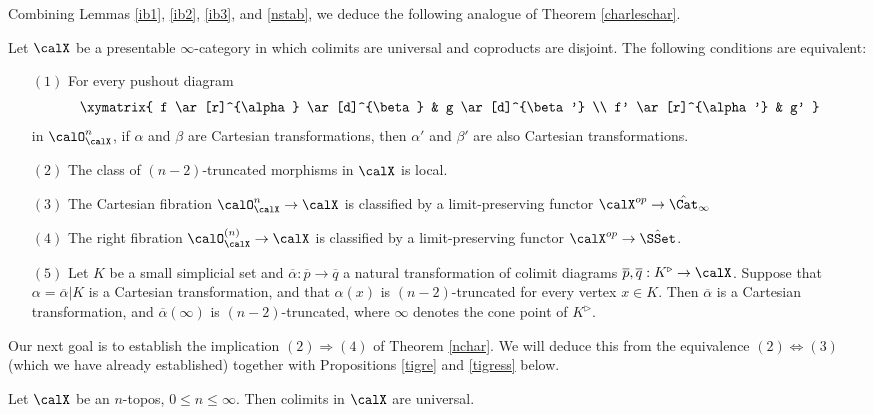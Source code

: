 Combining Lemmas \ref{ib1}, \ref{ib2}, \ref{ib3}, and \ref{nstab}, we deduce the following analogue of Theorem \ref{charleschar}.

\begin{theorem}\label{countercon}
Let $\calX$ be a presentable $\infty$-category in which colimits are universal and coproducts are disjoint. The following conditions are equivalent:
\begin{itemize}
\item[$(1)$] For every 
pushout diagram
$$ \xymatrix{ f \ar[r]^{\alpha} \ar[d]^{\beta} & g \ar[d]^{\beta'} \\
f' \ar[r]^{\alpha'} & g' }$$
in $\calO^{n}_{\calX}$, if $\alpha$ and $\beta$ are Cartesian transformations, then
$\alpha'$ and $\beta'$ are also Cartesian transformations.

\item[$(2)$] The class of $(n-2)$-truncated morphisms
in $\calX$ is local.

\item[$(3)$] The Cartesian fibration $\calO^{n}_{\calX} \rightarrow \calX$ is classified
by a limit-preserving functor $\calX^{op} \rightarrow \hat{\Cat}_{\infty}$

\item[$(4)$] The right fibration $\calO^{(n)}_{\calX} \rightarrow \calX$ is classified by a limit-preserving functor $\calX^{op} \rightarrow \hat{\SSet}$.

\item[$(5)$] Let $K$ be a small simplicial set and 
$\overline{\alpha}: \overline{p} \rightarrow \overline{q}$ a natural transformation of colimit diagrams
$\overline{p}, \overline{q}: K^{\triangleright} \rightarrow \calX$. Suppose that
$\alpha = \overline{\alpha} | K$ is a Cartesian transformation, and that $\alpha(x)$ is $(n-2)$-truncated for every vertex $x \in K$. Then $\overline{\alpha}$ is a Cartesian transformation, and
$\overline{\alpha}(\infty)$ is $(n-2)$-truncated, where $\infty$ denotes the cone point of
$K^{\triangleright}$.
\end{itemize}
\end{theorem}

Our next goal is to establish the implication $(2) \Rightarrow (4)$ of Theorem \ref{nchar}.
We will deduce this from the equivalence $(2) \Leftrightarrow (3)$ (which we have already established) together with Propositions \ref{tigre} and \ref{tigress} below.

\begin{proposition}\label{tigre}
Let $\calX$ be an $n$-topos, $0 \leq n \leq \infty$. Then colimits in $\calX$ are universal.
\end{proposition}

